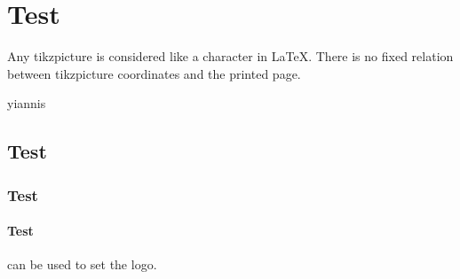 \documentclass{book}
\begin{document}
\tableofcontents
\mainmatter

\chapter{Test}
\expandafter\epigraph{Any tikzpicture is considered like a character in LaTeX. There is no fixed relation between tikzpicture coordinates and the printed page.}{yiannis}
\lipsum
\section{Test}
\lipsum
\subsection{Test}
\lipsum
\subsubsection{Test}
\lipsum

\CMDI{\tex} can be used to set the \tex logo.
\end{document}
